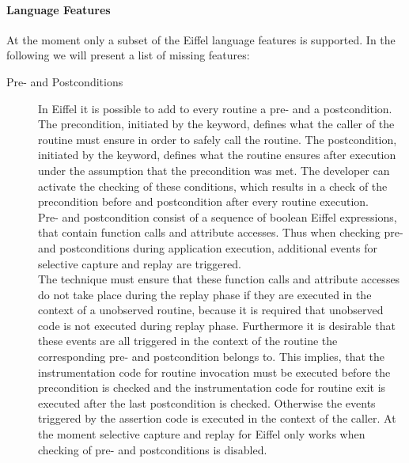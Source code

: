 \paragraph{Language Features}
At the moment only a subset of the Eiffel language features is supported. In the following we will present a list of missing features:

\begin{description}
 \item [Pre- and Postconditions] In Eiffel it is possible to add to every routine a pre- and a postcondition. The precondition, initiated by the  keyword, defines what the caller of the routine must ensure in order to safely call the routine. The postcondition, initiated by the  keyword, defines what the routine ensures after execution under the assumption that the precondition was met. The developer can activate the checking of these conditions, which results in a check of the precondition before and postcondition after every routine execution.\\
 Pre- and postcondition consist of a sequence of boolean Eiffel expressions, that contain function calls and attribute accesses. Thus when checking pre- and postconditions during application execution, additional events for selective capture and replay are triggered.\\
The technique must ensure that these function calls and attribute accesses do not take place during the replay phase if they are executed in the context of a unobserved routine, because it is required that unobserved code is not executed during replay phase. Furthermore it is desirable that these events are all triggered in the context of the routine the corresponding pre- and postcondition belongs to. This implies, that the instrumentation code for routine invocation must be executed before the precondition is checked and the instrumentation code for routine exit is executed after the last postcondition is checked. Otherwise the events triggered by the assertion code is executed in the context of the caller. At the moment selective capture and replay for Eiffel only works when checking of pre- and postconditions is disabled.


\end{description}
